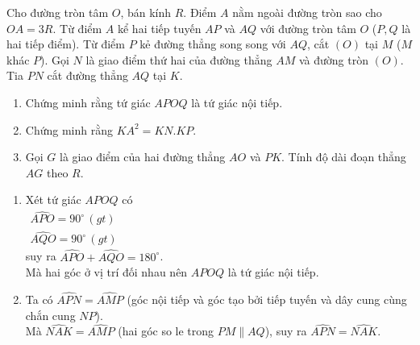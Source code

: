\begin{ex}%
   Cho đường tròn tâm $O$, bán kính $R$. Điểm $A$ nằm ngoài đường tròn sao cho $OA=3R$. Từ điểm $A$ kể hai tiếp tuyến $AP$ và $AQ$ với đường tròn tâm $O$ ($P, Q$ là hai tiếp điểm). Từ điểm $P$ kẻ đường thẳng song song với $AQ$, cắt $(O)$ tại $M$ ($M$ khác $P$). Gọi $N$ là giao điểm thứ hai của đường thẳng $AM$ và đường tròn $(O)$. Tia $PN$ cắt đường thẳng  $AQ$ tại $K$.
    \begin{enumerate}
        \item Chứng minh rằng tứ giác $APOQ$ là tứ giác nội tiếp.
        \item Chứng minh rằng $KA^2=KN.KP$.
        \item Gọi $G$ là giao điểm của hai đường thẳng $AO$ và $PK$. Tính độ dài đoạn thẳng $AG$ theo $R$.
    \end{enumerate}
\loigiai
    {
   \begin{center}
\end{center}
    \begin{enumerate}
        \item Xét tứ giác $APOQ$ có \\
        $
        \begin{aligned}
        \widehat{APO}=90^\circ\, (gt)\\
        \widehat{AQO}=90^\circ\, (gt)
        \end{aligned}
        $\\
        suy ra $ \widehat{APO}+ \widehat{AQO}=180^\circ$.\\
        Mà hai góc ở vị trí đối nhau nên $APOQ$ là tứ giác nội tiếp.
        \item Ta có  $\widehat{APN}=\widehat{AMP}$ (góc nội tiếp và góc tạo bởi tiếp tuyến và dây cung cùng chắn cung $NP$).\\
        Mà  $\widehat{NAK}=\widehat{AMP}$ (hai góc so le trong $PM \parallel AQ$), suy ra $\widehat{APN}=\widehat{NAK}$.\\

\end{enumerate}}
\end{ex}
